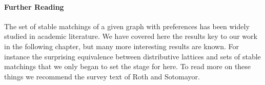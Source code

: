 \paragraph{Further Reading}
The set of stable matchings of a given graph with preferences has been widely studied in academic literature. We have covered here the results key to our work in the following chapter, but many more interesting results are known. For instance the surprising equivalence between distributive lattices and sets of stable matchings that we only began to set the stage for here. To read more on these things we recommend the survey text of Roth and Sotomayor\cite{roth1992two}.
